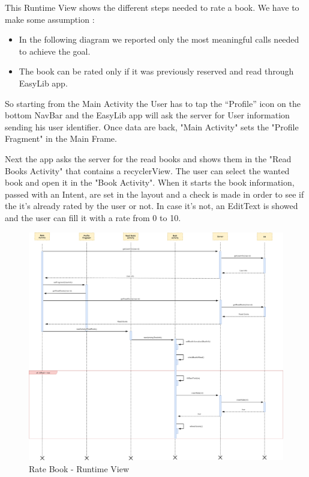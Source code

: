 \newpage
\vspace*{0cm}
This Runtime View shows the different steps needed to rate a book.
We have to make some assumption :
\begin{itemize}
	\setlength{\leftskip}{0.5cm}
	\item In the following diagram we reported only the most meaningful calls needed to achieve the goal.
	\item The book can be rated only if it was previously reserved and read through EasyLib app.
\end{itemize}
So starting from the Main Activity the User has to tap the “Profile” icon on the bottom NavBar and the EasyLib app will ask the server for User information sending his user identifier. Once data are back, "Main Activity" sets the "Profile Fragment" in the Main Frame.\par
Next the app asks the server for the read books and shows them in the "Read Books Activity" that contains a recyclerView. The user can select the wanted book and open it in the "Book Activity". When it starts the book information, passed with an Intent, are set in the layout and a check is made in order to see if the it's already rated by the user or not. In case it's not, an EditText is showed and the user can fill it with a rate from 0 to 10.
\newpage
\vspace*{0cm}
\begin{figure}[H]
	\centering
	\includegraphics[scale=0.22]{Images/Runtime/rate_book}
	\caption{Rate Book - Runtime View}
\end{figure}

